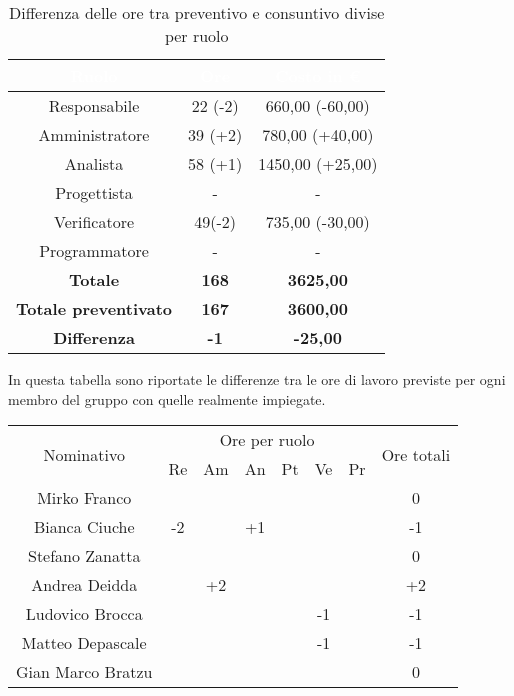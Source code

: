 \begin{flushleft}
	\begin{table}[!h]
		\begin{center}
			\begin{tabular}{ccc}
				\rowcolor{coolblack}
				\hline
				\textcolor{white}{Ruolo} & \textcolor{white}{Ore} & \textcolor{white}{Costo in \euro}\\
				\hline
				Responsabile   & 22 (-2)  &  660,00 (-60,00) 	\\ 
				Amministratore & 39 (+2)  &  780,00 (+40,00) 	\\ 
				Analista       & 58 (+1)  &  1450,00 (+25,00)   	\\ 
				Progettista    & -  	 &  - 					\\ 
				Verificatore   & 49(-2)  &  735,00 (-30,00) 	\\ 
				Programmatore  & -       &  -    		 		\\ \hline
				\textbf{Totale}& \textbf{168} & \textbf{3625,00}	\\ \hline 
				\textbf{Totale preventivato}& \textbf{167} & \textbf{3600,00}\\ \hline 
				\textbf{Differenza}& \textbf{-1} & \textbf{-25,00 }	\\ \hline  
			\end{tabular}
			\caption{Differenza delle ore tra preventivo e consuntivo divise per ruolo} 
		\end{center}
	\end{table}
\newpage
    In questa tabella  sono riportate le differenze tra le ore di lavoro previste per ogni membro del gruppo con quelle realmente impiegate.
       \begin{table}[!h]
 	\begin{center}
 		\begin{tabularx}{\textwidth}{|c|cccccc|c|}
 			
 			\hline
 			\multirow{2}{*}{Nominativo} & \multicolumn{6}{c|}{Ore per ruolo} & \multirow{2}{*}{Ore totali} \\ \cline{2-7}
 			& Re & Am & An & Pt & Ve & Pr &      \\ \hline
 			\endhead
 			Mirko Franco       &   &    &  &    &  &  & 0    \\ \hline
 			Bianca Ciuche      & -2 &  & +1 &    &  &   & -1       \\ \hline
 			Stefano Zanatta    &   &  &  &  &   &   &    0   \\ \hline
 			Andrea Deidda      &   & +2 &   &   &  &   &  +2  		\\ \hline
 			Ludovico Brocca    &   &  &  &  & -1 &   & -1       \\ \hline
 			Matteo Depascale   &   &  &   &   &  -1 &  & -1  		\\ \hline
 			Gian Marco Bratzu  &   &  &   &   &  &   & 0        \\ \hline
 			

\end{tabularx}
\end{center}
\end{table}
\end{flushleft}
